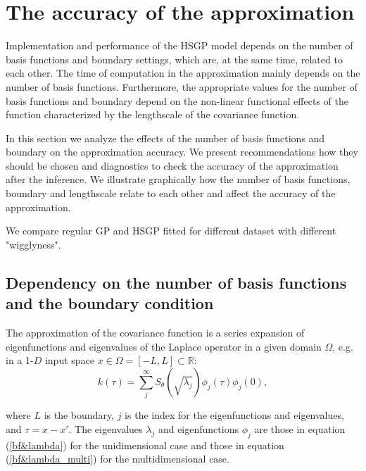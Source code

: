 \documentclass[]{interact}
\theoremstyle{plain}%
\theoremstyle{definition}
\theoremstyle{remark}
\begin{document}
\section{The accuracy of the approximation}

Implementation and performance of the HSGP model depends on the number of basis functions and boundary settings, which are, at the same time, related  to each other. The time of computation in the approximation mainly depends on the number of basis functions. Furthermore, the appropriate values for the number of basis functions and boundary depend on the non-linear functional effects of the function characterized by the lengthscale of the covariance function.

In this section we analyze the effects of the number of basis functions and boundary on the approximation accuracy. We present recommendations how they should be chosen and diagnostics to check the accuracy of the approximation after the inference.
We illustrate graphically how the number of basis functions, boundary and lengthscale relate to each other and affect the accuracy of the approximation.

We compare regular GP and HSGP fitted for different dataset with different "wigglyness".

\subsection{Dependency on the number of basis functions and the boundary condition}

The approximation of the covariance function is a series expansion of eigenfunctions and eigenvalues of the Laplace operator in a given domain $\Omega$, e.g. in a 1-$D$ input space $x\in \Omega=[-L,L]\subset \mathbb{R}$:
%
\begin{equation}\label{diffcov}
k(\tau) = \sum_{j}^{\infty} S_{\theta}(\sqrt{\lambda_j}) \phi_j(\tau) \phi_j(0),  \nonumber
\end{equation} 

\noindent where $L$ is the boundary, $j$ is the index for the eigenfunctions and eigenvalues, and $\tau=x-x'$. The eigenvalues $\lambda_j$ and eigenfunctions $\phi_j$ are those in equation (\ref{bf&lambda}) for the unidimensional case and those in equation (\ref{bf&lambda_multi}) for the multidimensional case.
\end{document}
